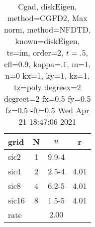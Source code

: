\begin{table}[H]\tableFont %
\begin{center}
\begin{tabular}{|l|c|c|c|} \hline 
grid  & N &  $ u $ & r \\ \hline 
      sic2 &     1 & \num{9.9}{-4} &        \\ \hline
      sic4 &     2 & \num{2.5}{-4} &  4.01  \\ \hline
      sic8 &     4 & \num{6.2}{-5} &  4.01  \\ \hline
     sic16 &     8 & \num{1.5}{-5} &  4.01  \\ \hline
    rate             &       &  $2.00$       &       \\ \hline
\end{tabular}
\caption{Cgad, diskEigen, method=CGFD2, Max norm, method=NFDTD, known=diskEigen, ts=im, order=$2$, $t=.5$, cfl=$0.9$, kappa=$.1$, m=1, n=0 kx=1, ky=1, kz=1,  tz=poly degreex=2 degreet=2 fx=0.5 fy=0.5 fz=0.5 -ft=0.5 Wed Apr 21 18:47:06 2021}\label{table:diskEigenNFDTDOrder2Max}
\end{center}
\end{table}
